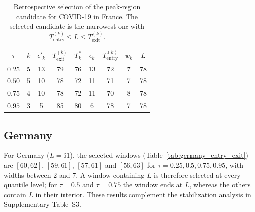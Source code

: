 \documentclass[12pt,a4paper]{article}
\begin{document}
\begin{table}[htbp]
	\centering
	\caption{Retrospective selection of the peak-region candidate for
		COVID-19 in France.
		The selected candidate is the narrowest one with
		$T_{\mathrm{entry}}^{(k)}\le L\le T_{\mathrm{exit}}^{(k)}$.}
	\label{tab:france_entry_exit}
	\begin{tabular}{c|cccccccc}
		\toprule
		$\tau$ &
		$k$ &
		$\epsilon'_k$ &
		$T_{\mathrm{exit}}^{(k)}$ &
		$T_k^*$ &
		$\epsilon_k$ &
		$T_{\mathrm{entry}}^{(k)}$ &
		$w_k$ &
		$L$ \\
		\midrule
		$0.25$ & 5 & 13 & 79 & 76 & 13 & 72 & 7  & 78 \\
		$0.50$ & 5 & 10 & 78 & 72 & 11 & 71 & 7 & 78 \\
		$0.75$ & 4 & 10 & 78 & 72 & 11 & 70 & 8 & 78 \\
		$0.95$ & 3 & 5 & 85 & 80 & 6 & 78 & 7 & 78 \\
		\bottomrule
	\end{tabular}
\end{table}


\subsection{Germany}
\label{subsec:germany}

{\color{blue}
For Germany ($L=61$), the selected windows
(Table~\ref{tab:germany_entry_exit}) are $[60,62]$, $[59,61]$,
$[57,61]$ and $[56,63]$ for $\tau=0.25,0.5,0.75,0.95$, with widths
between $2$ and $7$. A window containing $L$ is therefore selected at
every quantile level; for $\tau=0.5$ and $\tau=0.75$ the window ends at
$L$, whereas the others contain $L$ in their interior. These results
complement the stabilization analysis in Supplementary Table~S3.}
\end{document}
